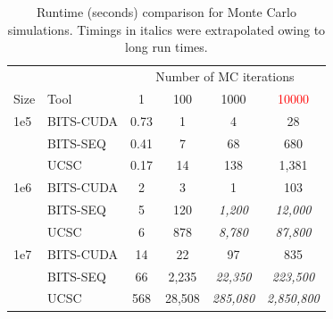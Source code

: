 \documentclass{bioinfo}
\begin{document}
\begin{center}
	\begin{table}[h!b!p!]
	\caption{Runtime (seconds) comparison for Monte Carlo simulations. 
	Timings in italics were extrapolated owing to long run times.}
	\begin{tabular}{l l c c c c}
	\multicolumn{2}{c}{} & \multicolumn{4}{c}{Number of MC iterations} \\
	\cline{3-6}
	Size & Tool & 1 & 100 & 1000 & \textcolor{red}{10000} \\
	\hline
	1e5 & BITS-CUDA & 0.73 & 1  & 4   & 28 \\
		& BITS-SEQ  & 0.41 & 7  & 68  & 680 \\
		& UCSC      & 0.17 & 14 & 138 & 1,381 \\
	1e6 & BITS-CUDA & 2 & 3    & 1       & 103 \\
		& BITS-SEQ  & 5 & 120  & \emph{1,200} & \emph{12,000} \\
		& UCSC      & 6 & 878  & \emph{8,780} & \emph{87,800} \\
	1e7 & BITS-CUDA & 14  & 22    & 97            & 835 \\
		& BITS-SEQ  & 66  & 2,235  & \emph{22,350}  & \emph{223,500} \\
		& UCSC      & 568 & 28,508 & \emph{285,080} & \emph{2,850,800} \\
	
	\hline
	\end{tabular}
	\label{table:avge}
	\end{table}
\end{center}
		

\end{document}
